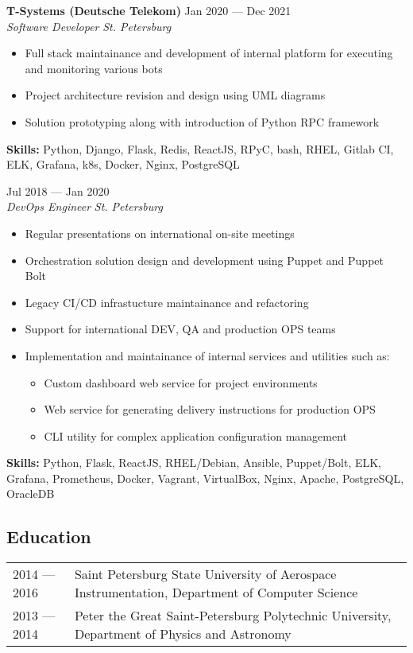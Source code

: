 \documentclass[10pt]{report}
\newenvironment{JobDescription}[5]{
    \vspace{ #5 }
    \flushleft
    {\bf #1 } \hfill { #2 }
    \\
    {\em #3 } \hfill {\em #4 }
    \begin{itemize}
} {
    \end{itemize}
}
\begin{document}
\begin{JobDescription}{T-Systems (Deutsche Telekom)}{Jan 2020 --- Dec 2021}{Software Developer}{St. Petersburg}{0mm}
    \item Full stack maintainance and development of internal platform for executing and monitoring various bots
    \item Project architecture revision and design using UML diagrams
    \item Solution prototyping along with introduction of Python RPC framework
\end{JobDescription}
{\bf Skills:} Python, Django, Flask, Redis, ReactJS, RPyC, bash, RHEL, Gitlab CI, ELK, Grafana, k8s, Docker, Nginx, PostgreSQL
\vspace{3mm}

\begin{JobDescription}{}{Jul 2018 --- Jan 2020}{DevOps Engineer}{St. Petersburg}{-3mm}
    \item Regular presentations on international on-site meetings
    \item Orchestration solution design and development using Puppet and Puppet Bolt
    \item Legacy CI/CD infrastucture maintainance and refactoring
    \item Support for international DEV, QA and production OPS teams
    \item Implementation and maintainance of internal services and utilities such as:
    \begin{itemize}
        \item Custom dashboard web service for project environments
        \item Web service for generating delivery instructions for production OPS
        \item CLI utility for complex application configuration management
    \end{itemize}
\end{JobDescription}
{\bf Skills:} Python, Flask, ReactJS, RHEL/Debian, Ansible, Puppet/Bolt, ELK, Grafana, Prometheus, Docker, Vagrant,
VirtualBox, Nginx, Apache, PostgreSQL, OracleDB

\vspace{3mm}

\subsection*{Education}
\begin{table}[H]
    \begin{tabular}{@{}p{}p{}}
        2014 --- 2016 & Saint Petersburg State University of Aerospace Instrumentation, Department of Computer Science \\
        2013 --- 2014 & Peter the Great Saint-Petersburg Polytechnic University, Department of Physics and Astronomy
    \end{tabular}
\end{table}
\end{document}

